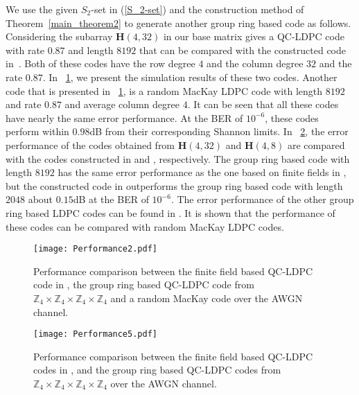 \documentclass[journal,draftclsnofoot,onecolumn,12pt,twoside]{IEEEtran}
\begin{document}
We use the given $S_2$-set in (\ref{S_2-set}) and the construction method of Theorem~\ref{main_theorem2} to generate another group ring based code as follows. Considering the subarray $\mathbf{H}(4,32)$  in our base matrix gives a QC-LDPC code with rate $0.87$ and length $8192$ that can be compared with the constructed code in~\cite[Example 11.9]{37}.  Both of these codes have the row degree $4$ and the column degree $32$ and the rate $0.87$.  In \figurename~\ref{figsim2}, we present the simulation results of these two codes.
Another code that is presented in \figurename~\ref{figsim2}, is a random MacKay LDPC code \cite{38} with length $8192$ and rate $0.87$ and average column degree $4$.  It can be seen that all these codes have nearly the same error performance. At the BER of $10^{ -6}$, these codes perform within  $0.98$dB from their corresponding Shannon limits.
In \figurename~\ref{figsim5}, the error performance of the  codes obtained from $\mathbf{H}(4,32)$ and $\mathbf{H}(4,8)$ are compared  with the  codes constructed in \cite[Example 2]{12} and \cite[Example 2]{6}, respectively. The group ring based code with length $8192$ has the same error performance as the one based on finite fields in \cite[Example 2]{12}, but the constructed code in \cite[Example 2]{6} outperforms the group ring based code with length $2048$ about $0.15$dB  at the BER of $10^{-6}$.
The error performance of the other group ring based LDPC codes can be found in \cite{50}. It is shown that the performance of these codes can be compared with random MacKay LDPC codes.
\begin{figure}[!h]
\centering
\texttt{[image: Performance2.pdf]}
\caption{Performance comparison between the finite field based QC-LDPC code in \cite[Example 11.9]{37}, the group ring based QC-LDPC code from $\mathbb{Z}_4\times \mathbb{Z}_4\times \mathbb{Z}_4\times \mathbb{Z}_4$ and a random MacKay  code \cite{38}  over the AWGN channel.}
\label{figsim2}
\end{figure}

\begin{figure}[!h]
\centering
\texttt{[image: Performance5.pdf]}
\caption{Performance comparison between the finite field based QC-LDPC codes in \cite[Example 2]{12}, \cite[Example 2]{6} and the group ring based QC-LDPC codes from $\mathbb{Z}_4\times \mathbb{Z}_4\times \mathbb{Z}_4\times \mathbb{Z}_4$  over the AWGN channel. }
\label{figsim5}
\end{figure}

%
\end{document}
